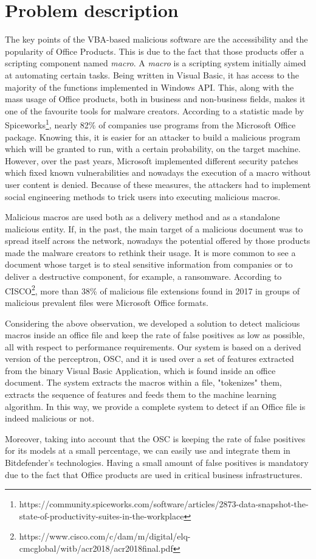 \section{Problem description}

The key points of the VBA-based malicious software are the accessibility and the popularity of Office Products. This is due to the fact that those products offer a scripting component named \textit{macro}. A \textit{macro} is a scripting system initially aimed at automating certain tasks. Being written in Visual Basic, it has access to the majority of the functions implemented in Windows API. This, along with the mass usage of Office products, both in business and non-business fields, makes it one of the favourite tools for malware creators. According to a statistic made by Spiceworks\footnote{https://community.spiceworks.com/software/articles/2873-data-snapshot-the-state-of-productivity-suites-in-the-workplace}, nearly 82\% of companies use programs from the Microsoft Office package. Knowing this, it is easier for an attacker to build a malicious program which will be granted to run, with a certain probability, on the target machine. However, over the past years, Microsoft implemented different security patches which fixed known vulnerabilities and nowadays the execution of a macro without user content is denied. Because of these measures, the attackers had to implement social engineering methods to trick users into executing malicious macros.
\par
Malicious macros are used both as a delivery method and as a standalone malicious entity. If, in the past, the main target of a malicious document was to spread itself across the network, nowadays the potential offered by those products made the malware creators to rethink their usage. It is more common to see a document whose target is to steal sensitive information from companies or to deliver a destructive component, for example, a ransomware. According to CISCO\footnote{https://www.cisco.com/c/dam/m/digital/elq-cmcglobal/witb/acr2018/acr2018final.pdf}, more than 38\% of malicious file extensions found in 2017 in groups of malicious prevalent files were Microsoft Office formats.
\par
Considering the above observation, we developed a solution to detect malicious macros inside an office file and keep the rate of false positives as low as possible, all with respect to performance requirements. Our system is based on a derived version of the perceptron, OSC\cite{OSC}, and it is used over a set of features extracted from the binary Visual Basic Application, which is found inside an office document. The system extracts the macros within a file, "tokenizes" them, extracts the sequence of features and feeds them to the machine learning algorithm. In this way, we provide a complete system to detect if an Office file is indeed malicious or not.
\par
Moreover, taking into account that the OSC is keeping the rate of false positives for its models at a small percentage, we can easily use and integrate them in Bitdefender's technologies. Having a small amount of false positives is mandatory due to the fact that Office products are used in critical business infrastructures.
